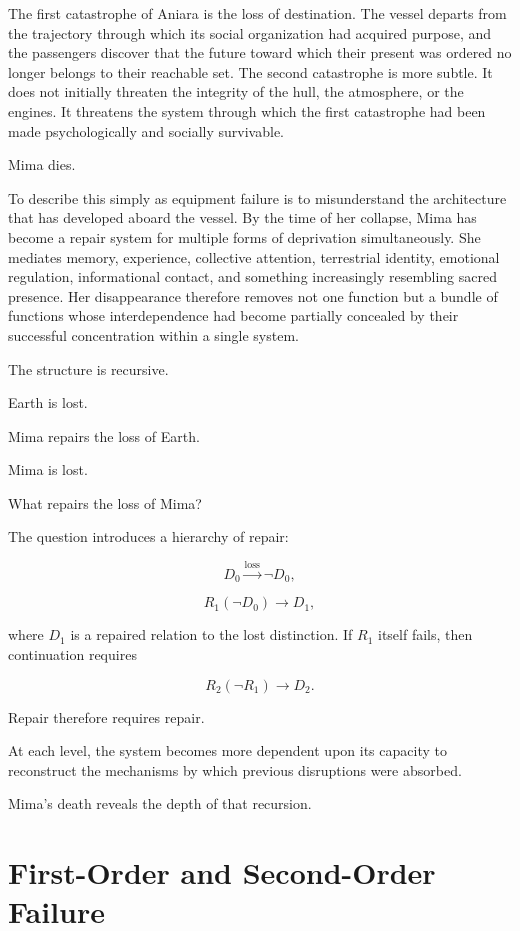 \documentclass[11pt,oneside]{book}
\theoremstyle{definition}
\theoremstyle{remark}
\begin{document}
The first catastrophe of Aniara is the loss of destination. The vessel departs from the trajectory through which its social organization had acquired purpose, and the passengers discover that the future toward which their present was ordered no longer belongs to their reachable set. The second catastrophe is more subtle. It does not initially threaten the integrity of the hull, the atmosphere, or the engines. It threatens the system through which the first catastrophe had been made psychologically and socially survivable.

Mima dies.

To describe this simply as equipment failure is to misunderstand the architecture that has developed aboard the vessel. By the time of her collapse, Mima has become a repair system for multiple forms of deprivation simultaneously. She mediates memory, experience, collective attention, terrestrial identity, emotional regulation, informational contact, and something increasingly resembling sacred presence. Her disappearance therefore removes not one function but a bundle of functions whose interdependence had become partially concealed by their successful concentration within a single system.

The structure is recursive.

Earth is lost.

Mima repairs the loss of Earth.

Mima is lost.

What repairs the loss of Mima?

The question introduces a hierarchy of repair:

\[
D_0
\xrightarrow{\text{loss}}
\neg D_0,
\]

\[
R_1(\neg D_0)
\rightarrow
D_1,
\]

where \(D_1\) is a repaired relation to the lost distinction. If \(R_1\) itself fails, then continuation requires

\[
R_2(\neg R_1)
\rightarrow
D_2.
\]

Repair therefore requires repair.

At each level, the system becomes more dependent upon its capacity to reconstruct the mechanisms by which previous disruptions were absorbed.

Mima's death reveals the depth of that recursion.

\section{First-Order and Second-Order Failure}
\end{document}
